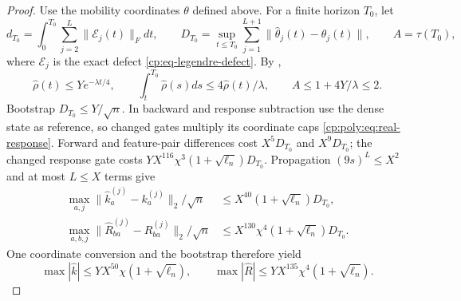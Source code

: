 \begin{proof}

Use the mobility coordinates $\theta$ defined above. For a finite horizon
$T_0$, let
\[
d_{T_0}=\int_0^{T_0}\sum_{j=2}^L\|\mathcal E_j(t)\|_Fdt,\qquad
D_{T_0}=\sup_{t\le T_0}\sum_{j=1}^{L+1}
 \|\widehat\theta_j(t)-\theta_j(t)\|,\qquad A=\tau(T_0),
\]
where $\mathcal E_j$ is the exact defect
\eqref{cp:eq-legendre-defect}. By ,
\[
\widehat\rho(t)\le Ye^{-\lambda t/4},\qquad
\int_t^{T_0}\widehat\rho(s)ds\le4\widehat\rho(t)/\lambda,\qquad
A\le1+4Y/\lambda\le2.
\]
Bootstrap $D_{T_0}\le Y/\sqrt n$.
In backward and response subtraction use the dense state as reference,
so changed gates multiply its coordinate caps
\eqref{cp:poly:eq:real-response}. Forward and feature-pair differences
cost $X^5D_{T_0}$ and $X^9D_{T_0}$; the changed response gate costs
$YX^{116}\chi^3(1+\sqrt{\ell_n})D_{T_0}$.
Propagation $(9s)^L\le X^2$ and at most $L\le X$ terms give
\[
\begin{aligned}
\max_{a,j}\|\widehat k_a^{(j)}-k_a^{(j)}\|_2/\sqrt n
 &\le X^{40}(1+\sqrt{\ell_n})D_{T_0},\\
\max_{a,b,j}\|\widehat R_{ba}^{(j)}-R_{ba}^{(j)}\|_2/\sqrt n
 &\le X^{130}\chi^4(1+\sqrt{\ell_n})D_{T_0}.
\end{aligned}
\]
One coordinate conversion and the bootstrap therefore yield
\[
\max|\widehat k|\le YX^{50}\chi(1+\sqrt{\ell_n}),\qquad
\max|\widehat R|\le YX^{135}\chi^4(1+\sqrt{\ell_n}).
\]


\end{proof}
